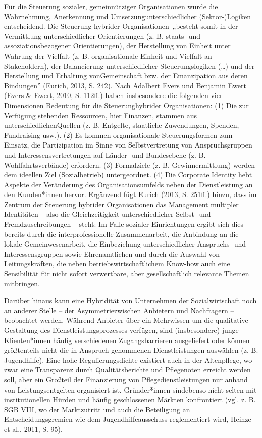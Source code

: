 \documentclass[
  letterpaper,
]{book}
\begin{document}
Für die Steuerung sozialer, gemeinnütziger Organisationen wurde die
Wahrnehmung, Anerkennung und Umsetzungunterschiedlicher (Sektor-)Logiken
entscheidend. Die Steuerung hybrider Organisationen~„besteht somit in
der Vermittlung unterschiedlicher Orientierungen (z. B. staats- und
assoziationsbezogener Orientierungen), der Herstellung von Einheit unter
Wahrung der Vielfalt (z. B. organisationale Einheit und Vielfalt an
Stakeholdern), der Balancierung unterschiedlicher Steuerungslogiken
(\ldots) und der Herstellung und Erhaltung vonGemeinschaft bzw. der
Emanzipation aus deren Bindungen'' (Eurich, 2013, S. 242). Nach Adalbert
Evers und Benjamin Ewert (Evers \& Ewert, 2010, S. 112ff.) haben
insbesondere die folgenden vier Dimensionen Bedeutung für die
Steuerunghybrider Organisationen: (1) Die zur Verfügung stehenden
Ressourcen, hier Finanzen, stammen aus unterschiedlichenQuellen (z. B.
Entgelte, staatliche Zuwendungen, Spenden, Fundraising usw.). (2) Es
kommen organisationale Steuerungsformen zum Einsatz, die Partizipation
im Sinne von Selbstvertretung von Anspruchsgruppen und
Interessensvertretungen auf Länder- und Bundesebene (z. B.
Wohlfahrtsverbände) erfordern. (3) Formalziele (z. B. Gewinnermittlung)
werden dem ideellen Ziel (Sozialbetrieb) untergeordnet. (4) Die
Corporate Identity hebt Aspekte der Veränderung des Organisationsumfelds
neben der Dienstleistung an den Kunden*innen hervor. Ergänzend fügt
Eurich (2013, S. 251ff.) hinzu, dass im Zentrum der Steuerung hybrider
Organisationen das Management multipler Identitäten -- also die
Gleichzeitigkeit unterschiedlicher Selbst- und Fremdzuschreibungen --
steht: Im Falle sozialer Einrichtungen ergibt sich dies bereits durch
die interprofessionelle Zusammenarbeit, die Anbindung an die lokale
Gemeinwesenarbeit, die Einbeziehung unterschiedlicher Anspruchs- und
Interessensgruppen sowie Ehrenamtlichen und durch die Auswahl von
Leitungskräften, die neben betriebswirtschaftlichem Know-how auch eine
Sensibilität für nicht sofort verwertbare, aber gesellschaftlich
relevante Themen mitbringen.

Darüber hinaus kann eine Hybridität von Unternehmen der Sozialwirtschaft
noch an anderer Stelle -- der Asymmetriezwischen Anbietern und
Nachfragern -- beobachtet werden. Während Anbieter über ein Mehrwissen
um die qualitative Gestaltung des Dienstleistungsprozesses verfügen,
sind (insbesondere) junge Klienten*innen häufig verschiedenen
Zugangsbarrieren ausgeliefert oder können größtenteils nicht die in
Anspruch genommenen Dienstleistungen auswählen (z. B. Jugendhilfe). Eine
hohe Regulierungsdichte existiert auch in der Altenpflege, wo zwar eine
Transparenz durch Qualitätsberichte und Pflegenoten erreicht werden
soll, aber ein Großteil der Finanzierung von Pflegedienstleistungen nur
anhand von Leistungsentgelten organisiert ist. Gründer*innen sindebenso
nicht selten mit institutionellen Hürden und häufig geschlossenen
Märkten konfrontiert (vgl. z. B. SGB VIII, wo der Marktzutritt und auch
die Beteiligung an Entscheidungsgremien wie dem Jugendhilfeausschuss
reglementiert wird, Heinze et al., 2011, S. 95).
\end{document}
